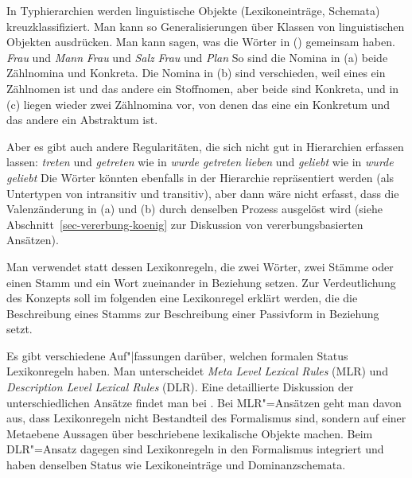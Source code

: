 In Typhierarchien werden linguistische Objekte (Lexikoneinträge, Schemata)
kreuzklassifiziert. Man kann so Generalisierungen über Klassen von linguistischen Objekten ausdrücken.
Man kann \zb sagen, was die Wörter in () gemeinsam haben.
\eal
\ex \emph{Frau} und \emph{Mann}
\ex \emph{Frau} und \emph{Salz}
\ex \emph{Frau} und \emph{Plan}
\zl
So sind die Nomina in (a) beide Zählnomina und Konkreta. Die Nomina in (b) sind verschieden,
weil eines ein Zählnomen ist und das andere ein Stoffnomen, aber beide sind Konkreta, und in (c)
liegen wieder zwei Zählnomina vor, von denen das eine ein Konkretum und das andere ein Abstraktum ist.

Aber es gibt auch andere Regularitäten, die sich nicht gut in Hierarchien erfassen lassen:
\eal
\ex \emph{treten} und \emph{getreten} wie in \emph{wurde getreten}
\ex \emph{lieben} und \emph{geliebt}  wie in \emph{wurde geliebt}
\zl
Die Wörter könnten ebenfalls in der Hierarchie repräsentiert werden (als Untertypen von intransitiv und transitiv),
aber dann wäre nicht erfasst, dass die Valenzänderung in (a) und (b) durch denselben Prozess
ausgelöst wird (siehe Abschnitt~\ref{sec-vererbung-koenig} zur Diskussion von vererbungsbasierten Ansätzen).

Man verwendet statt dessen Lexikonregeln, die zwei Wörter, zwei Stämme oder einen Stamm und ein
Wort zueinander in Beziehung setzen. 
Zur Verdeutlichung des Konzepts soll im folgenden eine Lexikonregel erklärt werden,
die die Beschreibung eines Stamms zur Beschreibung einer Passivform in Beziehung setzt.

Es gibt verschiedene Auf"|fassungen darüber, welchen formalen Status Lexikonregeln haben.
Man unterscheidet \emph{Meta Level Lexical Rules} (MLR) und \emph{Description Level Lexical Rules} (DLR).
Eine detaillierte Diskussion der unterschiedlichen Ansätze findet man bei .
Bei MLR"=Ansätzen geht man davon aus, dass Lexikonregeln nicht Bestandteil des Formalismus sind,
sondern auf einer Metaebene Aussagen über beschriebene lexikalische Objekte machen. Beim
DLR"=Ansatz dagegen sind Lexikonregeln in den Formalismus integriert und haben denselben
Status wie Lexikoneinträge und Dominanzschemata.




